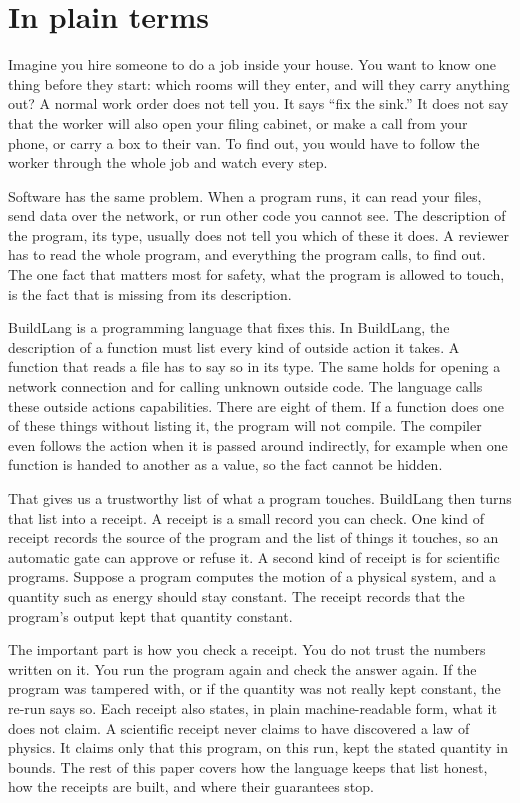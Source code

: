 \documentclass[11pt]{article}
\begin{document}
\section*{In plain terms}
Imagine you hire someone to do a job inside your house. You want to know one thing before they start: which rooms will they enter, and will they carry anything out? A normal work order does not tell you. It says ``fix the sink.'' It does not say that the worker will also open your filing cabinet, or make a call from your phone, or carry a box to their van. To find out, you would have to follow the worker through the whole job and watch every step.

Software has the same problem. When a program runs, it can read your files, send data over the network, or run other code you cannot see. The description of the program, its type, usually does not tell you which of these it does. A reviewer has to read the whole program, and everything the program calls, to find out. The one fact that matters most for safety, what the program is allowed to touch, is the fact that is missing from its description.

BuildLang is a programming language that fixes this. In BuildLang, the description of a function must list every kind of outside action it takes. A function that reads a file has to say so in its type. The same holds for opening a network connection and for calling unknown outside code. The language calls these outside actions capabilities. There are eight of them. If a function does one of these things without listing it, the program will not compile. The compiler even follows the action when it is passed around indirectly, for example when one function is handed to another as a value, so the fact cannot be hidden.

That gives us a trustworthy list of what a program touches. BuildLang then turns that list into a receipt. A receipt is a small record you can check. One kind of receipt records the source of the program and the list of things it touches, so an automatic gate can approve or refuse it. A second kind of receipt is for scientific programs. Suppose a program computes the motion of a physical system, and a quantity such as energy should stay constant. The receipt records that the program's output kept that quantity constant.

The important part is how you check a receipt. You do not trust the numbers written on it. You run the program again and check the answer again. If the program was tampered with, or if the quantity was not really kept constant, the re-run says so. Each receipt also states, in plain machine-readable form, what it does not claim. A scientific receipt never claims to have discovered a law of physics. It claims only that this program, on this run, kept the stated quantity in bounds. The rest of this paper covers how the language keeps that list honest, how the receipts are built, and where their guarantees stop.
\end{document}

